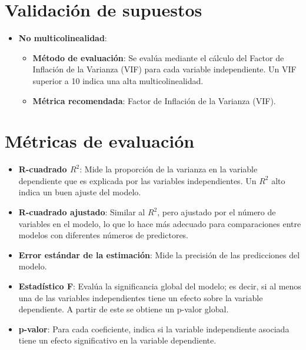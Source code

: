 \documentclass[
  letterpaper,
  DIV=11,
  numbers=noendperiod]{scrreprt}
\providecommand{\tightlist}{%
  \setlength{\itemsep}{0pt}\setlength{\parskip}{0pt}}\usepackage{longtable,booktabs,array}
\begin{document}
\section{Validación de supuestos}\label{validaciuxf3n-de-supuestos-2}

\begin{itemize}
\tightlist
\item
  \textbf{No multicolinealidad}:

  \begin{itemize}
  \tightlist
  \item
    \textbf{Método de evaluación}: Se evalúa mediante el cálculo del
    Factor de Inflación de la Varianza (VIF) para cada variable
    independiente. Un VIF superior a 10 indica una alta
    multicolinealidad.
  \item
    \textbf{Métrica recomendada}: Factor de Inflación de la Varianza
    (VIF).
  \end{itemize}
\end{itemize}

\section{Métricas de evaluación}\label{muxe9tricas-de-evaluaciuxf3n-1}

\begin{itemize}
\tightlist
\item
  \textbf{R-cuadrado \(R^2\)}: Mide la proporción de la varianza en la
  variable dependiente que es explicada por las variables
  independientes. Un \(R^2\) alto indica un buen ajuste del modelo.
\item
  \textbf{R-cuadrado ajustado}: Similar al \(R^2\), pero ajustado por el
  número de variables en el modelo, lo que lo hace más adecuado para
  comparaciones entre modelos con diferentes números de predictores.
\item
  \textbf{Error estándar de la estimación}: Mide la precisión de las
  predicciones del modelo.
\item
  \textbf{Estadístico F}: Evalúa la significancia global del modelo; es
  decir, si al menos una de las variables independientes tiene un efecto
  sobre la variable dependiente. A partir de este se obtiene un p-valor
  global.
\item
  \textbf{p-valor}: Para cada coeficiente, indica si la variable
  independiente asociada tiene un efecto significativo en la variable
  dependiente.
\end{itemize}
\end{document}
